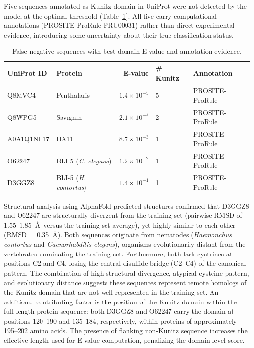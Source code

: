 \documentclass[11pt, a4paper]{article}
\begin{document}
Five sequences annotated as Kunitz domain in UniProt were 
not detected by the model at the optimal threshold 
(Table~\ref{tab:fn}). All five carry computational 
annotations (PROSITE-ProRule PRU00031) rather than 
direct experimental evidence, introducing some uncertainty 
about their true classification status.

\begin{table}[H]
\centering
\caption{False negative sequences with best domain 
E-value and annotation evidence.}
\label{tab:fn}
\begin{tabular}{llrll}
\toprule
UniProt ID & Protein & E-value & \# Kunitz & Annotation \\
\midrule
Q8MVC4 & Penthalaris & $1.4 \times 10^{-5}$ & 5 & 
    PROSITE-ProRule \\
Q8WPG5 & Savignin & $2.1 \times 10^{-4}$ & 2 & 
    PROSITE-ProRule \\
A0A1Q1NL17 & HA11 & $8.7 \times 10^{-3}$ & 1 & 
    PROSITE-ProRule \\
O62247 & BLI-5 (\textit{C. elegans}) & $1.2 \times 10^{-2}$ & 
    1 & PROSITE-ProRule \\
D3GGZ8 & BLI-5 (\textit{H. contortus}) & $1.4 \times 10^{-1}$ 
    & 1 & PROSITE-ProRule \\
\bottomrule
\end{tabular}
\end{table}

Structural analysis using AlphaFold-predicted structures 
\cite{Jumper2021} confirmed that D3GGZ8 and O62247 are 
structurally divergent from the training set (pairwise RMSD 
of 1.55--1.85~\AA\ versus the training set average), yet 
highly similar to each other (RMSD = 0.35~\AA). Both 
sequences originate from nematodes (\textit{Haemonchus 
contortus} and \textit{Caenorhabditis elegans}), organisms 
evolutionarily distant from the vertebrates dominating the 
training set. Furthermore, both lack cysteines at positions 
C2 and C4, losing the central disulfide bridge (C2--C4) of 
the canonical pattern. The combination of high structural 
divergence, atypical cysteine pattern, and evolutionary 
distance suggests these sequences represent remote homologs 
of the Kunitz domain that are not well represented in the 
training set. An additional contributing factor is the 
position of the Kunitz domain within the full-length protein 
sequence: both D3GGZ8 and O62247 carry the domain at 
positions 120--190 and 135--184, respectively, within 
proteins of approximately 195--202 amino acids. The presence 
of flanking non-Kunitz sequence increases the effective 
length used for E-value computation, penalizing the 
domain-level score.
\end{document}
